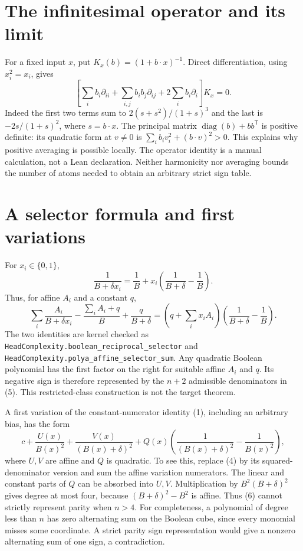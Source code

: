 \documentclass[11pt]{article}
\begin{document}
\section{The infinitesimal operator and its limit}

For a fixed input $x$, put $K_x(b)=(1+b\cdot x)^{-1}$. Direct
differentiation, using $x_i^2=x_i$, gives
\[
 \left[\sum_i b_i\partial_{ii}
       +\sum_{i,j}b_i b_j\partial_{ij}
       +2\sum_i b_i\partial_i\right]K_x=0.
 \tag{3}
\]
Indeed the first two terms sum to $2(s+s^2)/(1+s)^3$ and the
last is $-2s/(1+s)^2$, where $s=b\cdot x$. The principal matrix
$\operatorname{diag}(b)+bb^{\mathsf T}$ is positive definite:
its quadratic form at $v\ne0$ is
$\sum_i b_i v_i^2+(b\cdot v)^2>0$.
This explains why positive averaging is possible locally. The
operator identity is a manual calculation, not a Lean declaration.
Neither harmonicity nor averaging bounds the number of atoms needed
to obtain an arbitrary strict sign table.

\section{A selector formula and first variations}

For $x_i\in\{0,1\}$,
\[
 \frac1{B+\delta x_i}
   =\frac1B+x_i\left(\frac1{B+\delta}-\frac1B\right).
 \tag{4}
\]
Thus, for affine $A_i$ and a constant $q$,
\[
 \sum_i\frac{A_i}{B+\delta x_i}
 -\frac{\sum_i A_i+q}{B}+\frac q{B+\delta}
 =\left(q+\sum_i x_i A_i\right)
                \left(\frac1{B+\delta}-\frac1B\right).
 \tag{5}
\]
The two identities are kernel checked as
\texttt{HeadComplexity.boolean\_reciprocal\_selector} and
\texttt{HeadComplexity.polya\_affine\_selector\_sum}.
Any quadratic Boolean polynomial has the first factor on the right
for suitable affine $A_i$ and $q$. Its negative sign is therefore
represented by the $n+2$ admissible denominators in (5).
This restricted-class construction is not the target theorem.

A first variation of the constant-numerator identity (1), including
an arbitrary bias, has the form
\[
 c+\frac{U(x)}{B(x)^2}+\frac{V(x)}{(B(x)+\delta)^2}
       +Q(x)\left(\frac1{(B(x)+\delta)^2}-\frac1{B(x)^2}\right),
 \tag{6}
\]
where $U,V$ are affine and $Q$ is quadratic. To see this, replace
(4) by its squared-denominator version and sum the affine variation
numerators. The linear and constant parts of $Q$ can be absorbed
into $U,V$. Multiplication by $B^2(B+\delta)^2$ gives degree at
most four, because $(B+\delta)^2-B^2$ is affine.
Thus (6) cannot strictly represent parity when $n>4$.
For completeness, a polynomial of degree less than $n$ has zero
alternating sum on the Boolean cube, since every monomial misses
some coordinate. A strict parity sign representation would give a
nonzero alternating sum of one sign, a contradiction.
\end{document}

